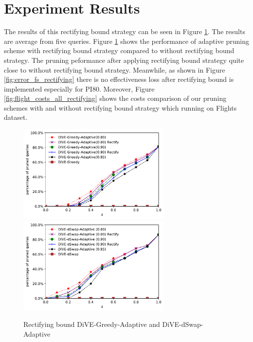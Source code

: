 \documentclass{article}
\begin{document}
\section{Experiment Results}
The results of this rectifying bound strategy can be seen in Figure \ref{fig:rectifying_bound}. The results are average from five queries. Figure \ref{fig:rectifying_bound} shows the performance of adaptive pruning scheme with rectifying bound strategy compared to without rectifying bound strategy. The pruning peformance after applying rectifying bound strategy quite close to without rectifying bound strategy. Meanwhile, as shown in Figure \ref{fig:error_fs_rectifying} there is no effectiveness loss after rectifying bound is implemented especially for PI80. Moreover, Figure \ref{fig:flight_costs_all_rectifying} shows the costs comparison of our pruning schemes with and without rectifying bound strategy which running on Flights dataset. 





\begin{figure}
	\begin{center}
		\includegraphics[width=3.0in]{figures/pruning_performance_greedy_adaptive_rectifying_compare}
		\includegraphics[width=3.0in]{figures/pruning_performance_dswap_adaptive_rectifying_compare}
		\caption{Rectifying bound DiVE-Greedy-Adaptive and DiVE-dSwap-Adaptive}
		\label{fig:rectifying_bound}
	\end{center}
\end{figure}
\end{document}
